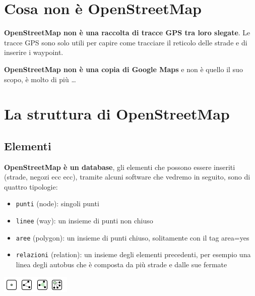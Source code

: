 \documentclass[a4paper,twoside,12pt,]{article}
\newcommand{\osm}{OpenStreetMap\xspace}
\newcommand{\gps}{GPS\xspace}
\begin{document}
\section{Cosa non è \osm}
\textbf{\osm non è una raccolta di tracce \gps tra loro slegate}. Le tracce \gps sono solo utili per capire come tracciare il reticolo delle strade e di inserire i waypoint.

\textbf{\osm non è una copia di Google Maps} e non è quello il suo scopo, è molto di più \dots

\section{La struttura di OpenStreetMap}
\subsection{Elementi}
\textbf{\osm è un database}, gli elementi che possono essere inseriti (strade, negozi ecc ecc), tramite alcuni software che vedremo in seguito, sono di quattro tipologie:
\begin{itemize}
 \item \texttt{punti} (node): singoli punti
 \item \texttt{linee} (way): un insieme di punti non chiuso
 \item \texttt{aree} (polygon): un insieme di punti chiuso, solitamente con il tag area=yes
 \item \texttt{relazioni} (relation): un insieme degli elementi precedenti, per esempio una linea degli autobus che è composta da più strade e dalle sue fermate
\end{itemize}
\begin{center}
\includegraphics{elements.png}
\end{center}
\end{document}
